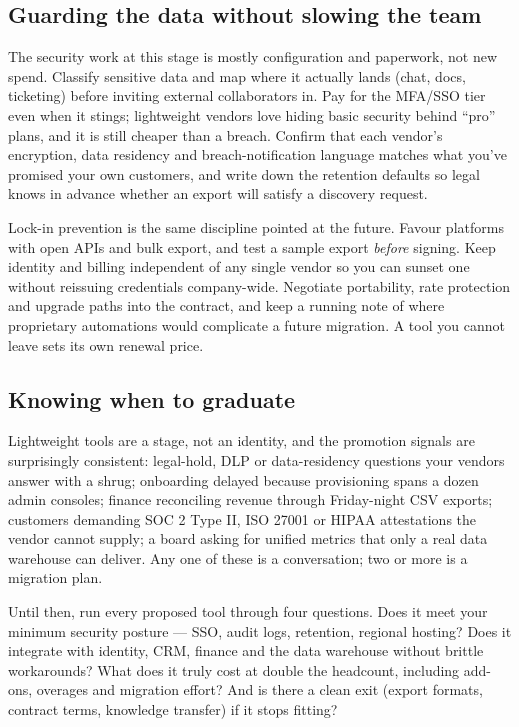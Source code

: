 \subsection{Guarding the data without slowing the team}


The security work at this stage is mostly configuration and paperwork, not new spend. Classify sensitive data and map where it actually lands (chat, docs, ticketing) before inviting external collaborators in. Pay for the MFA/SSO tier even when it stings; lightweight vendors love hiding basic security behind ``pro'' plans, and it is still cheaper than a breach. Confirm that each vendor's encryption, data residency and breach-notification language matches what you've promised your own customers, and write down the retention defaults so legal knows in advance whether an export will satisfy a discovery request.


Lock-in prevention is the same discipline pointed at the future. Favour platforms with open APIs and bulk export, and test a sample export \emph{before} signing. Keep identity and billing independent of any single vendor so you can sunset one without reissuing credentials company-wide. Negotiate portability, rate protection and upgrade paths into the contract, and keep a running note of where proprietary automations would complicate a future migration. A tool you cannot leave sets its own renewal price.



\subsection{Knowing when to graduate}


Lightweight tools are a stage, not an identity, and the promotion signals are surprisingly consistent: legal-hold, DLP or data-residency questions your vendors answer with a shrug; onboarding delayed because provisioning spans a dozen admin consoles; finance reconciling revenue through Friday-night CSV exports; customers demanding SOC 2 Type II, ISO 27001 or HIPAA attestations the vendor cannot supply; a board asking for unified metrics that only a real data warehouse can deliver. Any one of these is a conversation; two or more is a migration plan.


Until then, run every proposed tool through four questions. Does it meet your minimum security posture — SSO, audit logs, retention, regional hosting? Does it integrate with identity, CRM, finance and the data warehouse without brittle workarounds? What does it truly cost at double the headcount, including add-ons, overages and migration effort? And is there a clean exit (export formats, contract terms, knowledge transfer) if it stops fitting?



